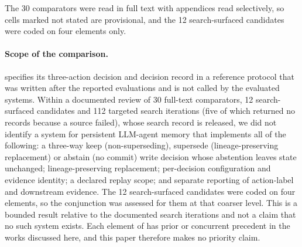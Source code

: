 The 30 comparators were read in full text with appendices read selectively, so cells marked not stated are provisional, and the 12 search-surfaced candidates were coded on four elements only.

\paragraph{Scope of the comparison.} \ask{} specifies its three-action decision and decision record in a reference protocol that was written after the reported evaluations and is not called by the evaluated systems. Within a documented review of 30 full-text comparators, 12 search-surfaced candidates and 112 targeted search iterations (five of which returned no records because a source failed), whose search record is released, we did not identify a system for persistent LLM-agent memory that implements all of the following: a three-way keep (non-superseding), supersede (lineage-preserving replacement) or abstain (no commit) write decision whose abstention leaves state unchanged; lineage-preserving replacement; per-decision configuration and evidence identity; a declared replay scope; and separate reporting of action-label and downstream evidence. The 12 search-surfaced candidates were coded on four elements, so the conjunction was assessed for them at that coarser level. This is a bounded result relative to the documented search iterations and not a claim that no such system exists. Each element of \ask{} has prior or concurrent precedent in the works discussed here, and this paper therefore makes no priority claim.
